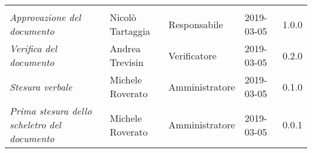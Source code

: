 \newpage 
\section*{}
\begin{table}[H]
	\centering
	\begin{tabular}{p{4cm}|C{3cm}|C{3cm}|R{2.5cm}|R{2cm}}
		
		 & & & & \\
		
		
		\emph{Approvazione del documento} & Nicolò Tartaggia & Responsabile & 2019-03-05 & 1.0.0 \\
		\hline
		
		\emph{Verifica del documento} & Andrea Trevisin & Verificatore & 2019-03-05 & 0.2.0 \\
		\hline
		
		\emph{Stesura verbale} & Michele Roverato & Amministratore & 2019-03-05 & 0.1.0 \\
		\hline
		
		\emph{Prima stesura dello scheletro del documento} & Michele Roverato & Amministratore & 2019-03-05 & 0.0.1 \\
		
	\end{tabular}
	
\end{table}


\clearpage